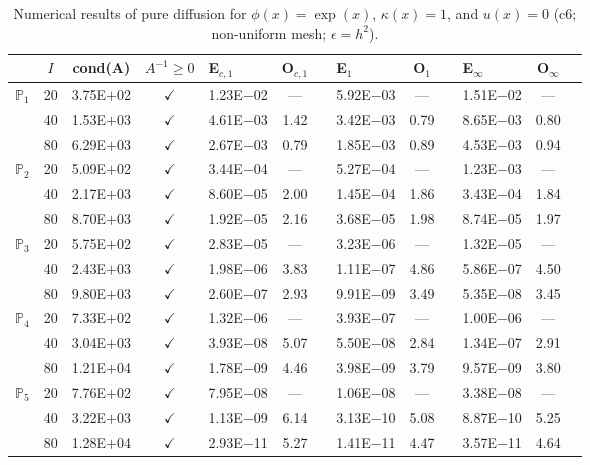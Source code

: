 \begin{table}[H]
\centering
\caption{Numerical results of pure diffusion for $\phi(x)=\exp(x)$, $\kappa(x)=1$, and $u(x)=0$ (c6; non-uniform mesh; $\epsilon=h^2$).}
\begin{tabular}{@{}l c c c l c c l c c l c c@{}}
\toprule
 & $I$ & cond(A) & $A^{-1}\geq 0$ &  E$_{c,1}$ & O$_{c,1}$ && E$_1$ & O$_1$ && E$_{\infty}$ & O$_{\infty}$\\
\midrule
\multirow{3}{*}{$\mathbb{P}_{1}$}
 & 20 & 3.75E$+$02 & $\checkmark$ & 1.23E$-$02 & --- && 5.92E$-$03 & --- && 1.51E$-$02 & ---\\
 & 40 & 1.53E$+$03 & $\checkmark$ & 4.61E$-$03 & 1.42 && 3.42E$-$03 & 0.79 && 8.65E$-$03 & 0.80\\
 & 80 & 6.29E$+$03 & $\checkmark$ & 2.67E$-$03 & 0.79 && 1.85E$-$03 & 0.89 && 4.53E$-$03 & 0.94\\
\midrule
\multirow{3}{*}{$\mathbb{P}_{2}$}
 & 20 & 5.09E$+$02 & $\checkmark$ & 3.44E$-$04 & --- && 5.27E$-$04 & --- && 1.23E$-$03 & ---\\
 & 40 & 2.17E$+$03 & $\checkmark$ & 8.60E$-$05 & 2.00 && 1.45E$-$04 & 1.86 && 3.43E$-$04 & 1.84\\
 & 80 & 8.70E$+$03 & $\checkmark$ & 1.92E$-$05 & 2.16 && 3.68E$-$05 & 1.98 && 8.74E$-$05 & 1.97\\
\midrule
\multirow{3}{*}{$\mathbb{P}_{3}$}
 & 20 & 5.75E$+$02 & $\checkmark$ & 2.83E$-$05 & --- && 3.23E$-$06 & --- && 1.32E$-$05 & ---\\
 & 40 & 2.43E$+$03 & $\checkmark$ & 1.98E$-$06 & 3.83 && 1.11E$-$07 & 4.86 && 5.86E$-$07 & 4.50\\
 & 80 & 9.80E$+$03 & $\checkmark$ & 2.60E$-$07 & 2.93 && 9.91E$-$09 & 3.49 && 5.35E$-$08 & 3.45\\
\midrule
\multirow{3}{*}{$\mathbb{P}_{4}$}
 & 20 & 7.33E$+$02 & $\checkmark$ & 1.32E$-$06 & --- && 3.93E$-$07 & --- && 1.00E$-$06 & ---\\
 & 40 & 3.04E$+$03 & $\checkmark$ & 3.93E$-$08 & 5.07 && 5.50E$-$08 & 2.84 && 1.34E$-$07 & 2.91\\
 & 80 & 1.21E$+$04 & $\checkmark$ & 1.78E$-$09 & 4.46 && 3.98E$-$09 & 3.79 && 9.57E$-$09 & 3.80\\
\midrule
\multirow{3}{*}{$\mathbb{P}_{5}$}
 & 20 & 7.76E$+$02 & $\checkmark$ & 7.95E$-$08 & --- && 1.06E$-$08 & --- && 3.38E$-$08 & ---\\
 & 40 & 3.22E$+$03 & $\checkmark$ & 1.13E$-$09 & 6.14 && 3.13E$-$10 & 5.08 && 8.87E$-$10 & 5.25\\
 & 80 & 1.28E$+$04 & $\checkmark$ & 2.93E$-$11 & 5.27 && 1.41E$-$11 & 4.47 && 3.57E$-$11 & 4.64\\
\bottomrule
\end{tabular}
\end{table}